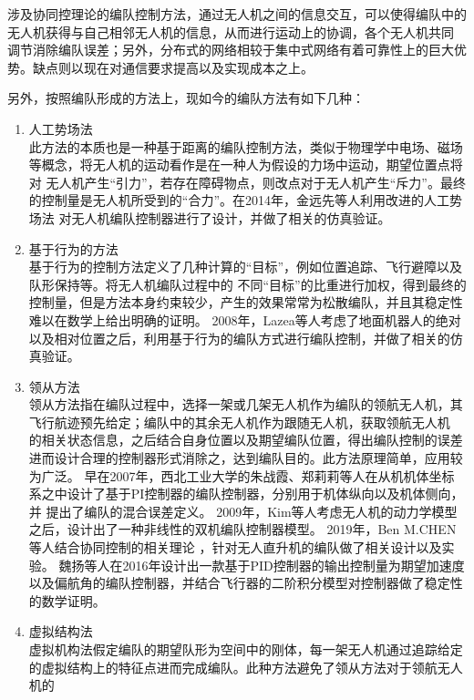 涉及协同控理论的编队控制方法，通过无人机之间的信息交互，可以使得编队中的无人机获得与自己相邻无人机的信息，从而进行运动上的协调，各个无人机共同
调节消除编队误差；另外，分布式的网络相较于集中式网络有着可靠性上的巨大优势。缺点则以现在对通信要求提高以及实现成本之上。

另外，按照编队形成的方法上，现如今的编队方法有如下几种：
\begin{enumerate}
    \item 人工势场法\\
        此方法的本质也是一种基于距离的编队控制方法，类似于物理学中电场、磁场等概念，将无人机的运动看作是在一种人为假设的力场中运动，期望位置点将对
        无人机产生“引力”，若存在障碍物点，则改点对于无人机产生“斥力”。最终的控制量是无人机所受到的“合力”。在2014年，金远先等人利用改进的人工势场法
        对无人机编队控制器进行了设计，并做了相关的仿真验证。\cite{Jin2014}
    \item 基于行为的方法\\
        基于行为的控制方法定义了几种计算的“目标”，例如位置追踪、飞行避障以及队形保持等。将无人机编队过程中的
        不同“目标”的比重进行加权，得到最终的控制量，但是方法本身约束较少，产生的效果常常为松散编队，并且其稳定性难以在数学上给出明确的证明。
        2008年，Lazea等人考虑了地面机器人的绝对以及相对位置之后，利用基于行为的编队方式进行编队控制，并做了相关的仿真验证。
    \item 领从方法\\
        领从方法指在编队过程中，选择一架或几架无人机作为编队的领航无人机，其飞行航迹预先给定；编队中的其余无人机作为跟随无人机，获取领航无人机
        的相关状态信息，之后结合自身位置以及期望编队位置，得出编队控制的误差进而设计合理的控制器形式消除之，达到编队目的。此方法原理简单，应用较为广泛。
        早在2007年，西北工业大学的朱战霞、郑莉莉等人在从机机体坐标系之中设计了基于PI控制器的编队控制器，分别用于机体纵向以及机体侧向，并
        提出了编队的混合误差定义。\cite{ZhuZhanXia2007}
        2009年，Kim等人考虑无人机的动力学模型之后，设计出了一种非线性的双机编队控制器模型。\cite{Kim2009A} 2019年，Ben M.CHEN等人结合协同控制的相关理论
        ，针对无人直升机的编队做了相关设计以及实验。\cite{Ben2010Design}
        魏扬等人在2016年设计出一款基于PID控制器的输出控制量为期望加速度以及偏航角的编队控制器，并结合飞行器的二阶积分模型对控制器做了稳定性的数学证明。\cite{WeiYang2016}
    \item 虚拟结构法\\
        虚拟机构法假定编队的期望队形为空间中的刚体，每一架无人机通过追踪给定的虚拟结构上的特征点进而完成编队。此种方法避免了领从方法对于领航无人机的

\end{enumerate}
